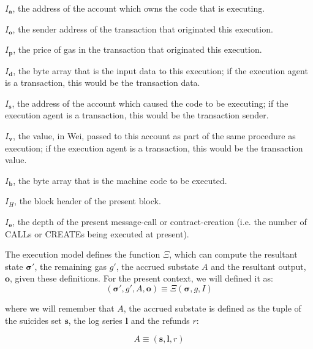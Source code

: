 \documentclass[9pt,oneside]{amsart}
\begin{document}
\begin{multicols}{2}
\begin{itemize}\hypertarget{I a}{
\item $I_\mathbf{a}$, the address of the account which owns the code that is executing.}\hypertarget{I o}{
\item $I_\mathbf{o}$, the sender address of the transaction that originated this execution.}\hypertarget{I p}{
\item $I_\mathbf{p}$, the price of gas in the transaction that originated this execution.}\hypertarget{I d}{
\item $I_\mathbf{d}$, the byte array that is the input data to this execution; if the execution agent is a transaction, this would be the transaction data.}\hypertarget{I s}{
\item $I_\mathbf{s}$, the address of the account which caused the code to be executing; if the execution agent is a transaction, this would be the transaction sender.}\hypertarget{I v}{
\item $I_\mathbf{v}$, the value, in Wei, passed to this account as part of the same procedure as execution; if the execution agent is a transaction, this would be the transaction value.}\hypertarget{I b}{
\item $I_\mathbf{b}$, the byte array that is the machine code to be executed.
\item $I_H$, the block header of the present block.}\hypertarget{I e}{
\item $I_\mathbf{e}$, the depth of the present message-call or contract-creation (i.e. the number of {\small CALL}s or {\small CREATE}s being executed at present).}
\end{itemize}

The execution model defines the function $\Xi$, which can compute the resultant state $\boldsymbol{\sigma}'$, the remaining gas $g'$, the accrued substate $A$ and the resultant output, $\mathbf{o}$, given these definitions. For the present context, we will defined it as:
\begin{equation}
(\boldsymbol{\sigma}', g', A, \mathbf{o}) \equiv \Xi(\boldsymbol{\sigma}, g, I)
\end{equation}

where we will remember that $A$, the accrued substate is defined as the tuple of the suicides set $\mathbf{s}$, the log series $\mathbf{l}$ and the refunds $r$:

\begin{equation}
A \equiv (\mathbf{s}, \mathbf{l}, r)
\end{equation}


\end{multicols}
\end{document}
